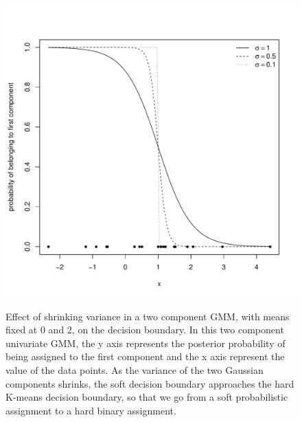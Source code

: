 \begin{figure}
\centering
\begin{minipage}{.65\textwidth}
\includegraphics[scale=.6]{figures/gmm-variance.pdf}
\end{minipage}
{ Effect of shrinking variance in a two component \gls{GMM}, with means fixed at $0$ and $2$, on the decision boundary. }
{
  In this two component univariate \gls{GMM}, the y axis represents the posterior probability of being assigned to the first component and
  the x axis represent the value of the data points.
  As the variance of the two Gaussian components shrinks, the soft decision boundary approaches the hard K-means decision boundary, so that we go from
  a soft probabilistic assignment to a hard binary assignment. 
}
\end{figure}


